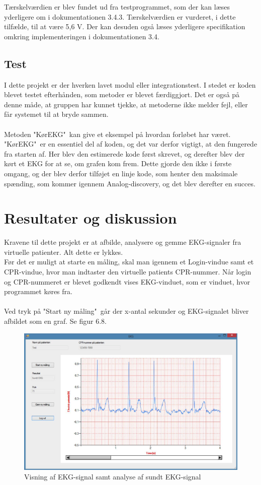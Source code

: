 Tærskelværdien er blev fundet ud fra testprogrammet, som der kan læses yderligere om i dokumentationen 3.4.3. Tærskelværdien er vurderet, i dette tilfælde, til at være 5,6 V. Der kan desuden også læses yderligere specifikation omkring implementeringen i dokumentationen 3.4. 


\subsection{Test}
I dette projekt er der hverken lavet modul eller integrationstest. I stedet er koden blevet testet efterhånden, som metoder er blevet færdiggjort. Det er også på denne måde, at gruppen har kunnet tjekke, at metoderne ikke melder fejl, eller får systemet til at bryde sammen. \\ \\
Metoden "KørEKG"\  kan give et eksempel på hvordan forløbet har været. "KørEKG"\  er en essentiel del af koden, og det var derfor vigtigt, at den fungerede fra starten af. Her blev den estimerede kode først skrevet, og derefter blev der kørt et EKG for at se, om grafen kom frem. Dette gjorde den ikke i første omgang, og der blev derfor tilføjet en linje kode, som henter den maksimale spænding, som kommer igennem Analog-discovery, og det blev derefter en succes. 

\section{Resultater og diskussion}
Kravene til dette projekt er at afbilde, analysere og gemme EKG-signaler fra virtuelle patienter. Alt dette er lykkes. \\ 
Før det er muligt at starte en måling, skal man igennem et Login-vindue samt et CPR-vindue, hvor man indtaster den virtuelle patients CPR-nummer. Når login og CPR-nummeret er blevet godkendt vises EKG-vinduet, som er vinduet, hvor programmet køres fra. \\ \\
Ved tryk på "Start ny måling"\  går der x-antal sekunder og EKG-signalet bliver afbildet som en graf. Se figur 6.8. 

\begin{figure}[H]
	\centering
	\includegraphics[width=1\textwidth]{Figurer/Snip20150525_25}
	\caption{Visning af EKG-signal samt analyse af sundt EKG-signal}
\end{figure}

